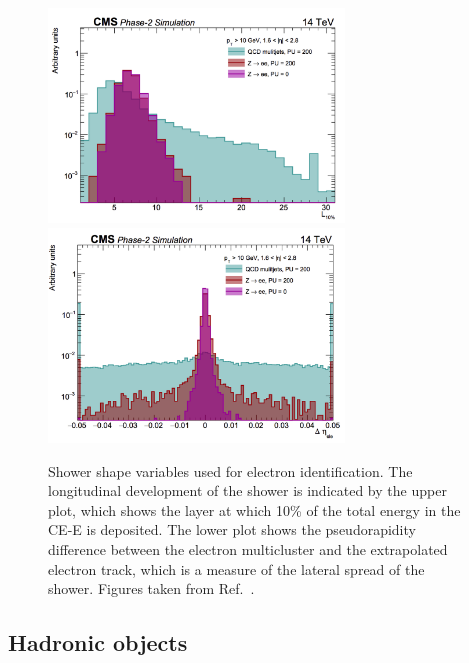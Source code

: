 \begin{figure}[h!]
  \centering
  \includegraphics[width=0.7\textwidth]{Figures/HGCAL/electronIDlon.png}
  \includegraphics[width=0.7\textwidth]{Figures/HGCAL/electronIDlat.png}
  \caption[Distributions of electron shower shape variables.]
  {
    Shower shape variables used for electron identification.
    The longitudinal development of the shower is indicated by the upper plot, 
    which shows the layer at which 10\% of the total energy in the CE-E is deposited.
    The lower plot shows the pseudorapidity difference between the electron multicluster
    and the extrapolated electron track, which is a measure of the lateral spread of the shower.
    Figures taken from Ref.~\cite{HGCAL}.
  }
  \label{fig:hgcal_electronID}
\end{figure}

\subsection{Hadronic objects}

